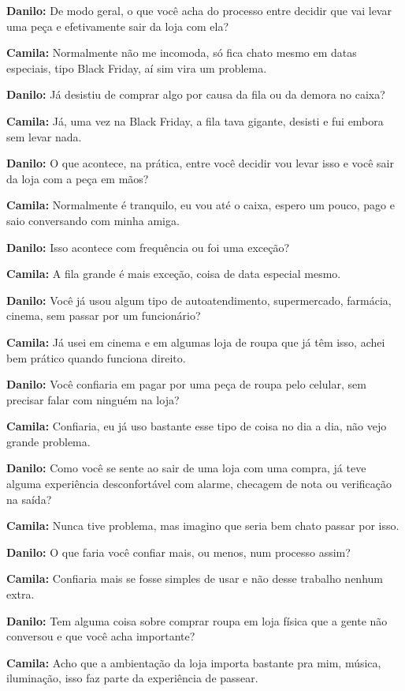 \textbf{Danilo:} De modo geral, o que você acha do processo entre decidir que vai levar uma peça e efetivamente sair da loja com ela?

\textbf{Camila:} Normalmente não me incomoda, só fica chato mesmo em datas especiais, tipo Black Friday, aí sim vira um problema.

\textbf{Danilo:} Já desistiu de comprar algo por causa da fila ou da demora no caixa?

\textbf{Camila:} Já, uma vez na Black Friday, a fila tava gigante, desisti e fui embora sem levar nada.

\textbf{Danilo:} O que acontece, na prática, entre você decidir vou levar isso e você sair da loja com a peça em mãos?

\textbf{Camila:} Normalmente é tranquilo, eu vou até o caixa, espero um pouco, pago e saio conversando com minha amiga.

\textbf{Danilo:} Isso acontece com frequência ou foi uma exceção?

\textbf{Camila:} A fila grande é mais exceção, coisa de data especial mesmo.

\textbf{Danilo:} Você já usou algum tipo de autoatendimento, supermercado, farmácia, cinema, sem passar por um funcionário?

\textbf{Camila:} Já usei em cinema e em algumas loja de roupa que já têm isso, achei bem prático quando funciona direito.

\textbf{Danilo:} Você confiaria em pagar por uma peça de roupa pelo celular, sem precisar falar com ninguém na loja?

\textbf{Camila:} Confiaria, eu já uso bastante esse tipo de coisa no dia a dia, não vejo grande problema.

\textbf{Danilo:} Como você se sente ao sair de uma loja com uma compra, já teve alguma experiência desconfortável com alarme, checagem de nota ou verificação na saída?

\textbf{Camila:} Nunca tive problema, mas imagino que seria bem chato passar por isso.

\textbf{Danilo:} O que faria você confiar mais, ou menos, num processo assim?

\textbf{Camila:} Confiaria mais se fosse simples de usar e não desse trabalho nenhum extra.

\textbf{Danilo:} Tem alguma coisa sobre comprar roupa em loja física que a gente não conversou e que você acha importante?

\textbf{Camila:} Acho que a ambientação da loja importa bastante pra mim, música, iluminação, isso faz parte da experiência de passear.

